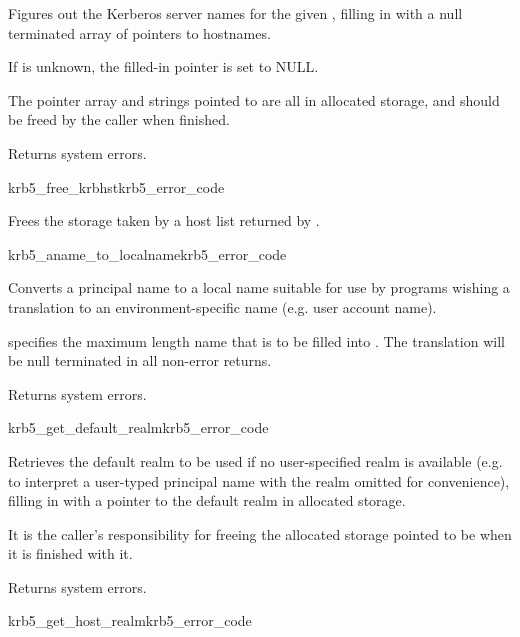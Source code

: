 Figures out the Kerberos server names for the given ,
filling in  with a null terminated array of
pointers to hostnames. 
 
If  is unknown, the filled-in pointer is set to NULL.

The pointer array and strings pointed to are all in allocated storage,
and should be freed by the caller when finished.

Returns system errors.

\begin{funcdecl}{krb5_free_krbhst}{krb5_error_code}{\funcin}
\end{funcdecl}

Frees the storage taken by a host list returned by .

\begin{funcdecl}{krb5_aname_to_localname}{krb5_error_code}{\funcin}
\funcout
{}
\end{funcdecl}

Converts a principal name  to a local name suitable for use by
programs wishing a translation to an environment-specific name (e.g.
user account name).

 specifies the maximum length name that is to be filled into
.
The translation will be null terminated in all non-error returns.

Returns system errors.

\begin{funcdecl}{krb5_get_default_realm}{krb5_error_code}
\funcout
{}
\end{funcdecl}

Retrieves the default realm to be used if no user-specified realm is
available (e.g. to interpret a user-typed principal name with the
realm omitted for convenience), filling in  with a
pointer to the default realm in allocated storage.

It is the caller's responsibility for freeing the allocated storage
pointed to be  when it is finished with it.

Returns system errors.

\begin{funcdecl}{krb5_get_host_realm}{krb5_error_code}{\funcin}
\funcout
{}
\end{funcdecl}

